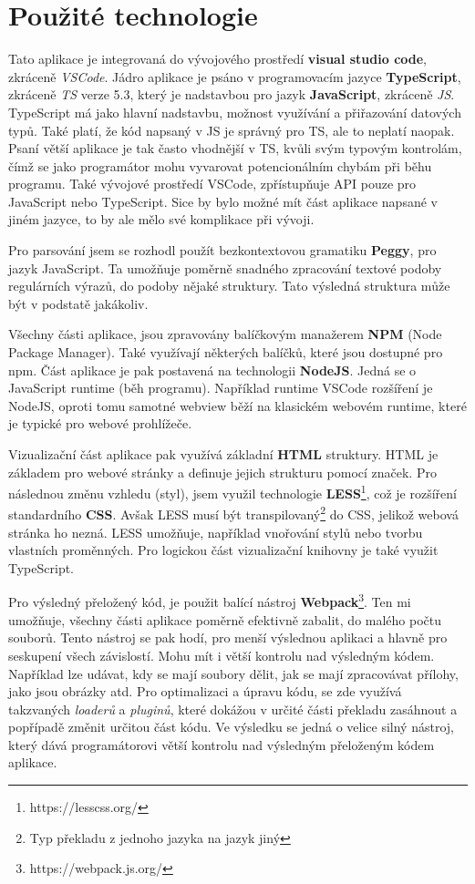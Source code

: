 \newpage

\section{Použité technologie}\label{sec:USEDtech}
Tato aplikace je integrovaná do vývojového prostředí \textbf{visual studio code}, 
zkráceně \textit{VSCode}. Jádro aplikace je psáno v programovacím jazyce \textbf{TypeScript}, zkráceně \textit{TS} verze 5.3, který je nadstavbou
pro jazyk \textbf{JavaScript}, zkráceně \textit{JS}. TypeScript má jako hlavní nadstavbu, možnost využívání a přiřazování datových typů.
Také platí, že kód napsaný v JS je správný pro TS, ale to neplatí naopak.
Psaní větší aplikace je tak často vhodnější v TS, 
kvůli svým typovým kontrolám, čímž se jako programátor mohu vyvarovat potencionálním chybám při běhu programu.
Také vývojové prostředí VSCode, zpřístupňuje API pouze pro JavaScript nebo TypeScript.
Sice by bylo možné mít část aplikace napsané v jiném jazyce, to by ale mělo své komplikace při vývoji.

Pro parsování jsem se rozhodl použít bezkontextovou gramatiku \textbf{Peggy}\cite{Peggy, Peggyjs}, pro jazyk JavaScript.
Ta umožňuje poměrně snadného zpracování textové podoby regulárních výrazů, do podoby nějaké struktury.
Tato výsledná struktura může být v podstatě jakákoliv.

Všechny části aplikace, jsou zpravovány balíčkovým manažerem \textbf{NPM} (Node Package Manager).
Také využívají některých balíčků, které jsou dostupné pro npm. 
Část aplikace je pak postavená na technologii \textbf{NodeJS}.
Jedná se o JavaScript runtime (běh programu). 
Například runtime VSCode rozšíření je NodeJS, oproti tomu samotné webview běží na klasickém webovém runtime, které je typické pro webové prohlížeče.

Vizualizační část aplikace pak využívá základní \textbf{HTML} struktury.  
HTML je základem pro webové stránky a definuje jejich strukturu pomocí značek.
Pro následnou změnu vzhledu (styl), jsem využil technologie \textbf{LESS}\footnote{https://lesscss.org/}, což je rozšíření standardního \textbf{CSS}.
Avšak LESS musí být transpilovaný\footnote{Typ překladu z jednoho jazyka na jazyk jiný} do CSS, jelikož webová stránka ho nezná. 
LESS umožňuje, například vnořování stylů nebo tvorbu vlastních proměnných.
Pro logickou část vizualizační knihovny je také využit TypeScript.

Pro výsledný přeložený kód, je použit balící nástroj \textbf{Webpack}\footnote{https://webpack.js.org/}.
Ten mi umožňuje, všechny části aplikace poměrně efektivně zabalit, do malého počtu souborů. 
Tento nástroj se pak hodí, pro menší výslednou aplikaci a hlavně pro seskupení všech závislostí.
Mohu mít i větší kontrolu nad výsledným kódem.
Například lze udávat, kdy se mají soubory dělit, jak se mají zpracovávat přílohy, jako jsou obrázky atd.
Pro optimalizaci a úpravu kódu, se zde využívá takzvaných \textit{loaderů} a \textit{pluginů}, 
které dokážou v určité části překladu zasáhnout a popřípadě změnit určitou část kódu.
Ve výsledku se jedná o velice silný nástroj, který dává programátorovi větší kontrolu nad výsledným přeloženým kódem aplikace.


